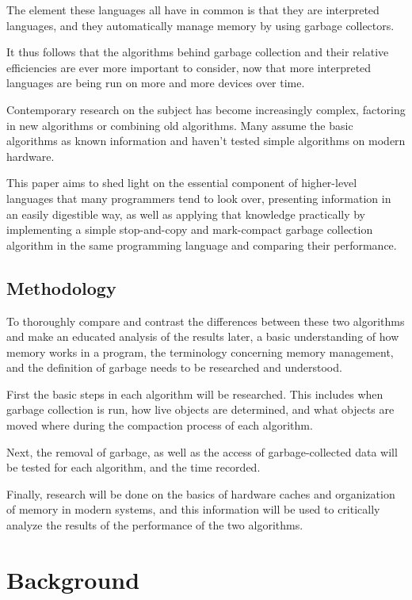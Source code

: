 \documentclass[index]{subfiles}
\begin{document}
The element these languages all have in common is that they are interpreted languages, and they automatically manage memory by using garbage collectors.

It thus follows that the algorithms behind garbage collection and their relative efficiencies are ever more important to consider, now that more interpreted languages are being run on more and more devices over time. 

Contemporary research on the subject has become increasingly complex, factoring in new algorithms or combining old algorithms. Many assume the basic algorithms as known information and haven't tested simple algorithms on modern hardware.

This paper aims to shed light on the essential component of higher-level languages that many programmers tend to look over, presenting information in an easily digestible way, as well as applying that knowledge practically by implementing a simple stop-and-copy and mark-compact garbage collection algorithm in the same programming language and comparing their performance.

\subsection{Methodology}

To thoroughly compare and contrast the differences between these two algorithms and make an educated analysis of the results later, a basic understanding of how memory works in a program, the terminology concerning memory management, and the definition of garbage needs to be researched and understood.

First the basic steps in each algorithm will be researched. This includes when garbage collection is run, how live objects are determined, and what objects are moved where during the compaction process of each algorithm.

Next, the removal of garbage, as well as the access of garbage-collected data will be tested for each algorithm, and the time recorded.

Finally, research will be done on the basics of hardware caches and organization of memory in modern systems, and this information will be used to critically analyze the results of the performance of the two algorithms.

\section{Background}
\end{document}
